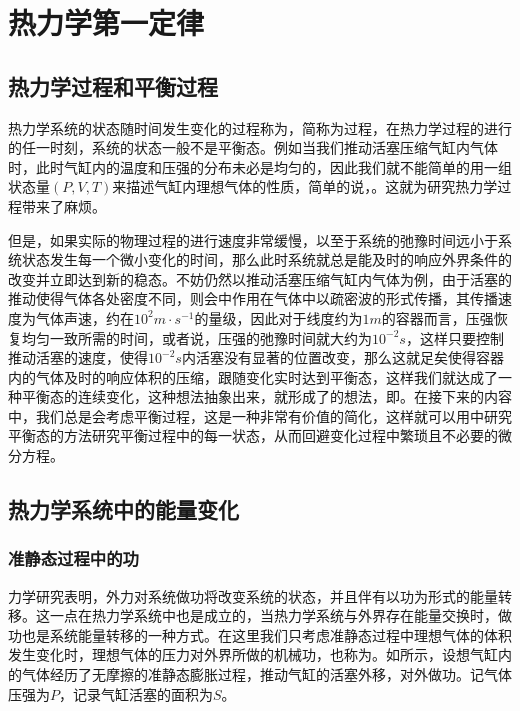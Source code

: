 \section{热力学第一定律}
\label{sec:热力学第一定律}
\subsection{热力学过程和平衡过程}
\label{subsec:热力学过程和平衡过程}
热力学系统的状态随时间发生变化的过程称为，简称为过程，在热力学过程的进行的任一时刻，系统的状态一般不是平衡态。例如当我们推动活塞压缩气缸内气体时，此时气缸内的温度和压强的分布未必是均匀的，因此我们就不能简单的用一组状态量$(P,V,T)$来描述气缸内理想气体的性质，简单的说，。这就为研究热力学过程带来了麻烦。

但是，如果实际的物理过程的进行速度非常缓慢，以至于系统的弛豫时间远小于系统状态发生每一个微小变化的时间，那么此时系统就总是能及时的响应外界条件的改变并立即达到新的稳态。不妨仍然以推动活塞压缩气缸内气体为例，由于活塞的推动使得气体各处密度不同，则会中作用在气体中以疏密波的形式传播，其传播速度为气体声速，约在$10^2\si{m\cdot s^{-1}}$的量级，因此对于线度约为$1\si{m}$的容器而言，压强恢复均匀一致所需的时间，或者说，压强的弛豫时间就大约为$10^{-2}\si{s}$，这样只要控制推动活塞的速度，使得$10^{-2}\si{s}$内活塞没有显著的位置改变，那么这就足矣使得容器内的气体及时的响应体积的压缩，跟随变化实时达到平衡态，这样我们就达成了一种平衡态的连续变化，这种想法抽象出来，就形成了的想法，即。在接下来的内容中，我们总是会考虑平衡过程，这是一种非常有价值的简化，这样就可以用中研究平衡态的方法研究平衡过程中的每一状态，从而回避变化过程中繁琐且不必要的微分方程。

\subsection{热力学系统中的能量变化}
\label{subsec:热力学系统中的能量变化}
\subsubsection{准静态过程中的功}
力学研究表明，外力对系统做功将改变系统的状态，并且伴有以功为形式的能量转移。这一点在热力学系统中也是成立的，当热力学系统与外界存在能量交换时，做功也是系统能量转移的一种方式。在这里我们只考虑准静态过程中理想气体的体积发生变化时，理想气体的压力对外界所做的机械功，也称为。如所示，设想气缸内的气体经历了无摩擦的准静态膨胀过程，推动气缸的活塞外移，对外做功。记气体压强为$P$，记录气缸活塞的面积为$S$。

